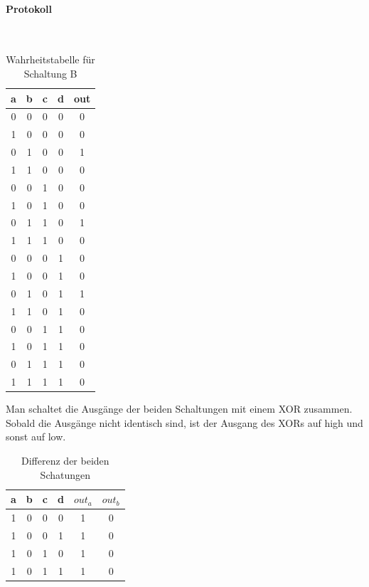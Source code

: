 \documentclass[10pt]{scrreprt}
\begin{document}
    \paragraph{Protokoll}
    $ $
    \begin{table}[H]
        \centering
        \begin{tabular}{cccc|c}
            \toprule
            a & b & c & d & out \\
            \midrule
            0 & 0 & 0 & 0 & 0\\
            1 & 0 & 0 & 0 & 0\\
            0 & 1 & 0 & 0 & 1\\
            1 & 1 & 0 & 0 & 0\\
            0 & 0 & 1 & 0 & 0\\
            1 & 0 & 1 & 0 & 0\\
            0 & 1 & 1 & 0 & 1\\
            1 & 1 & 1 & 0 & 0\\
            0 & 0 & 0 & 1 & 0\\
            1 & 0 & 0 & 1 & 0\\
            0 & 1 & 0 & 1 & 1\\
            1 & 1 & 0 & 1 & 0\\
            0 & 0 & 1 & 1 & 0\\
            1 & 0 & 1 & 1 & 0\\
            0 & 1 & 1 & 1 & 0\\
            1 & 1 & 1 & 1 & 0\\
            \bottomrule
        \end{tabular}
        \caption{Wahrheitstabelle für Schaltung B}
    \end{table}
    Man schaltet die Ausgänge der beiden Schaltungen mit einem XOR zusammen. Sobald
    die Ausgänge nicht identisch sind, ist der Ausgang des XORs auf high und sonst
    auf low.
    \begin{table}[H]
        \centering
        \begin{tabular}{cccc|cc}
            \toprule
            a & b & c & d & $out_a$ & $out_b$\\
            \midrule
            1 & 0 & 0 & 0 & 1 & 0\\
            1 & 0 & 0 & 1 & 1 & 0\\
            1 & 0 & 1 & 0 & 1 & 0\\
            1 & 0 & 1 & 1 & 1 & 0\\
            \bottomrule
        \end{tabular}
        \caption{Differenz der beiden Schatungen}
    \end{table}
\end{document}
